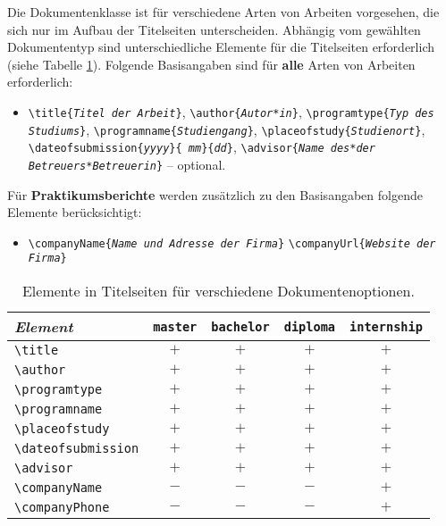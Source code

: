Die Dokumentenklasse ist für verschiedene Arten von Arbeiten vorgesehen, die
sich nur im Aufbau der Titelseiten unterscheiden. Abhängig vom gewählten
Dokumententyp sind unterschiedliche Elemente für die Titelseiten erforderlich
(siehe Tabelle \ref{tab:TitelElemente}). Folgende Basisangaben sind für
\textbf{alle} Arten von Arbeiten erforderlich:
%
\begin{itemize}
    \item[] %
    \verb!\title{!\texttt{\em Titel der Arbeit}\verb!}!, \newline%
    \verb!\author{!\texttt{\em Autor*in}\verb!}!, \newline%
    \verb!\programtype{!\texttt{\em Typ des Studiums}\verb!}!, \newline%
    \verb!\programname{!\texttt{\em Studiengang}\verb!}!, \newline%
    \verb!\placeofstudy{!\texttt{\em Studienort}\verb!}!, \newline%
    \verb!\dateofsubmission{!\texttt{\em yyyy}\verb!}{!\texttt{\em
    mm}\verb!}{!\texttt{\em dd}\verb!}!, \newline%
    \verb!\advisor{!\texttt{\em Name des*der Betreuers*Betreuerin}\verb!}! --
    optional.
\end{itemize}
%
\noindent
Für \textbf{Praktikumsberichte} werden zusätzlich zu den Basisangaben
folgende Elemente berücksichtigt:
%
\begin{itemize}
    \item[] %
    \verb!\companyName{!\texttt{\em Name und Adresse der Firma}\verb!}!
    \newline%
    \verb!\companyUrl{!\texttt{\em Website der Firma}\verb!}!
\end{itemize}

\begin{table}
    \caption{Elemente in Titelseiten für verschiedene Dokumentenoptionen.}
    \label{tab:TitelElemente}
    \centering\small
    \begin{tabular}{@{}lcccc@{}}
        \toprule
        \emph{Element} & \texttt{master} & \texttt{bachelor} & 
				\texttt{diploma} & \texttt{internship} \\
        \midrule
        \verb!\title!            & $+$ & $+$ & $+$ & $+$ \\
        \verb!\author!           & $+$ & $+$ & $+$ & $+$ \\
        \verb!\programtype!      & $+$ & $+$ & $+$ & $+$ \\
        \verb!\programname!      & $+$ & $+$ & $+$ & $+$ \\
        \verb!\placeofstudy!     & $+$ & $+$ & $+$ & $+$ \\
        \verb!\dateofsubmission! & $+$ & $+$ & $+$ & $+$ \\
        \verb!\advisor!          & $+$ & $+$ & $+$ & $+$ \\
        \verb!\companyName!      & $-$ & $-$ & $-$ & $+$ \\
        \verb!\companyPhone!     & $-$ & $-$ & $-$ & $+$ \\
        \bottomrule
    \end{tabular}
\end{table}

